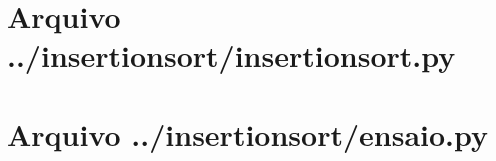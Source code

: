 \documentclass[12pt,a4paper,twoside]{report}
\begin{document}
\clearpage
\clearpage
{}
\appendix

\chapter{Arquivo ../insertionsort/insertionsort.py \label{ap:insertionsort}}


\chapter{Arquivo ../insertionsort/ensaio.py \label{ap:insertionsortensaio}}

\end{document}
